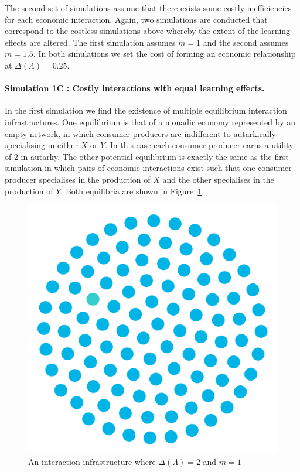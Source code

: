 The second set of simulations assume that there exists some costly inefficiencies for each economic interaction. Again, two simulations are conducted that correspond to the costless simulations above whereby the extent of the learning effects are altered. The first simulation assumes $m = 1$ and the second assumes $m = 1.5$. In both simulations we set the cost of forming an economic relationship at $\Delta(\Lambda) = 0.25$.

\paragraph{Simulation 1C : Costly interactions with equal learning effects.}

In the first simulation we find the existence of multiple equilibrium interaction infrastructures. One equilibrium is that of a monadic economy represented by an empty network, in which consumer-producers are indifferent to autarkically specialising in either $X$ or $Y$. In this case each consumer-producer earns a utility of $2$ in autarky. The other potential equilibrium is exactly the same as the first simulation in which pairs of economic interactions exist such that one consumer-producer specialises in the production of $X$ and the other specialises in the production of $Y$. Both equilibria are shown in Figure~\ref{Sim3}.

\begin{figure}[t]
\centering
\includegraphics[scale=0.22]{imgs/Sim3E.png}
\caption{An interaction infrastructure where $\Delta(\Lambda)=2$ and $m=1$}
\label{Sim3}
\end{figure}

